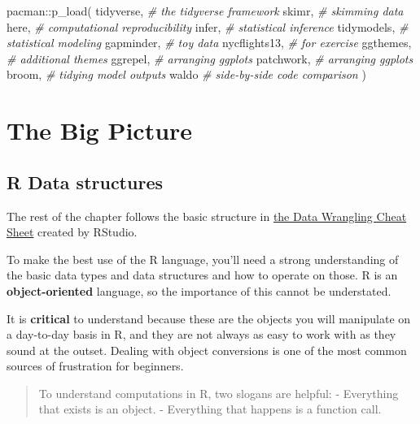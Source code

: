 \documentclass[
]{book}
\newenvironment{Shaded}{\begin{snugshade}}{\end{snugshade}}
\newcommand{\CommentTok}[1]{\textcolor[rgb]{0.56,0.35,0.01}{\textit{#1}}}
\newcommand{\FunctionTok}[1]{\textcolor[rgb]{0.00,0.00,0.00}{#1}}
\newcommand{\NormalTok}[1]{#1}
\newcommand{\SpecialCharTok}[1]{\textcolor[rgb]{0.00,0.00,0.00}{#1}}
\begin{document}
\begin{Shaded}
\begin{Highlighting}[]
\NormalTok{pacman}\SpecialCharTok{::}\FunctionTok{p\_load}\NormalTok{(}
\NormalTok{  tidyverse, }\CommentTok{\# the tidyverse framework}
\NormalTok{  skimr, }\CommentTok{\# skimming data }
\NormalTok{  here, }\CommentTok{\# computational reproducibility}
\NormalTok{  infer, }\CommentTok{\# statistical inference }
\NormalTok{  tidymodels, }\CommentTok{\# statistical modeling }
\NormalTok{  gapminder, }\CommentTok{\# toy data}
\NormalTok{  nycflights13, }\CommentTok{\# for exercise}
\NormalTok{  ggthemes, }\CommentTok{\# additional themes}
\NormalTok{  ggrepel, }\CommentTok{\# arranging ggplots}
\NormalTok{  patchwork, }\CommentTok{\# arranging ggplots}
\NormalTok{  broom, }\CommentTok{\# tidying model outputs}
\NormalTok{  waldo }\CommentTok{\# side{-}by{-}side code comparison}
\NormalTok{)}
\end{Highlighting}
\end{Shaded}

\hypertarget{the-big-picture-4}{%
\section{The Big Picture}\label{the-big-picture-4}}

\hypertarget{r-data-structures}{%
\subsection{R Data structures}\label{r-data-structures}}

The rest of the chapter follows the basic structure in \href{https://rstudio.com/wp-content/uploads/2015/02/data-wrangling-cheatsheet.pdf}{the Data Wrangling Cheat Sheet} created by RStudio.

To make the best use of the R language, you'll need a strong understanding of the basic data types and data structures and how to operate on those. R is an \textbf{object-oriented} language, so the importance of this cannot be understated.

It is \textbf{critical} to understand because these are the objects you will manipulate on a day-to-day basis in R, and they are not always as easy to work with as they sound at the outset. Dealing with object conversions is one of the most common sources of frustration for beginners.

\begin{quote}
To understand computations in R, two slogans are helpful:
- Everything that exists is an object.
- Everything that happens is a function call.
\end{quote}
\end{document}
